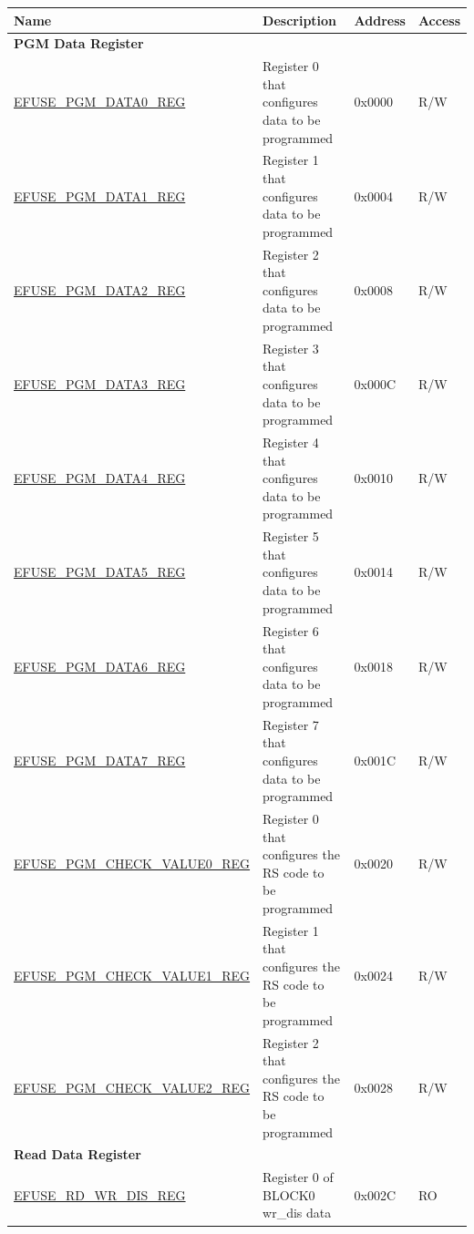 \begin{longtable}{ | p{6cm} | p{7.2cm} | p{1.3cm} | p{1.5cm} | }
\hline\rowcolor{lightgray}
\textbf{Name} & \textbf{Description} &  \textbf{Address} & \textbf{Access} \\ \hline
\endhead
\multicolumn{4}{|l|}{\textbf{PGM Data Register}} \\ \hline
\hyperref[regdesc:EFUSEPGMDATA0REG]{EFUSE\_PGM\_DATA0\_REG} & Register 0 that configures data to be programmed & 0x0000 & R/W \\ \hline
\hyperref[regdesc:EFUSEPGMDATA1REG]{EFUSE\_PGM\_DATA1\_REG} & Register 1 that configures data to be programmed & 0x0004 & R/W \\ \hline
\hyperref[regdesc:EFUSEPGMDATA2REG]{EFUSE\_PGM\_DATA2\_REG} & Register 2 that configures data to be programmed & 0x0008 & R/W \\ \hline
\hyperref[regdesc:EFUSEPGMDATA3REG]{EFUSE\_PGM\_DATA3\_REG} & Register 3 that configures data to be programmed & 0x000C & R/W \\ \hline
\hyperref[regdesc:EFUSEPGMDATA4REG]{EFUSE\_PGM\_DATA4\_REG} & Register 4 that configures data to be programmed & 0x0010 & R/W \\ \hline
\hyperref[regdesc:EFUSEPGMDATA5REG]{EFUSE\_PGM\_DATA5\_REG} & Register 5 that configures data to be programmed & 0x0014 & R/W \\ \hline
\hyperref[regdesc:EFUSEPGMDATA6REG]{EFUSE\_PGM\_DATA6\_REG} & Register 6 that configures data to be programmed & 0x0018 & R/W \\ \hline
\hyperref[regdesc:EFUSEPGMDATA7REG]{EFUSE\_PGM\_DATA7\_REG} & Register 7 that configures data to be programmed & 0x001C & R/W \\ \hline
\hyperref[regdesc:EFUSEPGMCHECKVALUE0REG]{EFUSE\_PGM\_CHECK\_VALUE0\_REG} & Register 0 that configures the RS code to be programmed & 0x0020 & R/W \\ \hline
\hyperref[regdesc:EFUSEPGMCHECKVALUE1REG]{EFUSE\_PGM\_CHECK\_VALUE1\_REG} & Register 1 that configures the RS code to be programmed & 0x0024 & R/W \\ \hline
\hyperref[regdesc:EFUSEPGMCHECKVALUE2REG]{EFUSE\_PGM\_CHECK\_VALUE2\_REG} & Register 2 that configures the RS code to be programmed & 0x0028 & R/W \\ \hline
\multicolumn{4}{|l|}{\textbf{Read Data Register}} \\ \hline
\hyperref[regdesc:EFUSERDWRDISREG]{EFUSE\_RD\_WR\_DIS\_REG} & Register 0 of BLOCK0 wr\_dis data & 0x002C & RO \\ \hline

\end{longtable}
